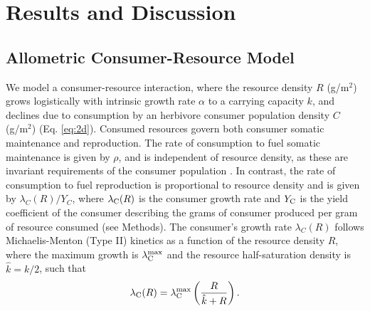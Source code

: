 \documentclass[11pt]{article}
\begin{document}









\section*{Results and Discussion}
\subsection*{Allometric Consumer-Resource Model}
We model a consumer-resource interaction, where the resource density $R$ (g/m${}^2$) grows logistically with intrinsic growth rate $\alpha$ to a carrying capacity $k$, and declines due to consumption by an herbivore consumer population density $C$ (g/m${}^2$) (Eq. \ref{eq:2d}).
Consumed resources govern both consumer somatic maintenance and reproduction. 
The rate of consumption to fuel somatic maintenance is given by $\rho$, and is independent of resource density, as these are invariant requirements of the consumer population \citep{yeakel2018dynamics}.
In contrast, the rate of consumption to fuel reproduction is proportional to resource density and is given by $\lambda_C(R)/Y_C$, where $\lambda_{\rm C}(R)$ is the consumer growth rate and $Y_{\rm C}$ is the yield coefficient of the consumer describing the grams of consumer produced per gram of resource consumed (see Methods).
The consumer's growth rate $\lambda_C(R)$ follows Michaelis-Menton (Type II) kinetics as a function of the resource density $R$, where the maximum growth is $\lambda^{\rm max}_{\rm C}$ and the resource half-saturation density is $\hat{k} = k/2$, such that 
\begin{equation}
    \lambda_{\rm C}(R) = \lambda^{\rm max}_{\rm C}\left(\frac{R}{\hat{k}+R}\right).
\end{equation}
\end{document}
